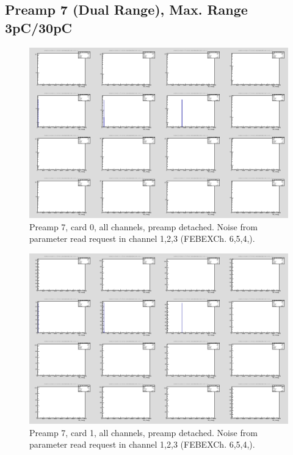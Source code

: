 \documentclass{report}
\begin{document}
\newpage
\clearpage

\subsection{Preamp 7 (Dual Range), Max. Range 3pC/30pC}
\begin{figure}[!htb]
  \includegraphics[width=\linewidth]{rc_bus_test/preamp7_card0_gamma_all.png}
  \caption{Preamp 7, card 0, all channels, preamp detached. Noise from parameter read request in channel 1,2,3 (FEBEXCh. 6,5,4,).}
\end{figure}
\begin{figure}[!htb]
  \includegraphics[width=\linewidth]{rc_bus_test/preamp7_card1_gamma_all.png}
  \caption{Preamp 7, card 1, all channels, preamp detached. Noise from parameter read request in channel 1,2,3 (FEBEXCh. 6,5,4,).}
\end{figure}
\end{document}
